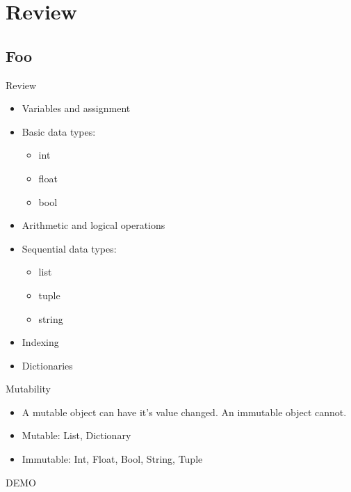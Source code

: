\documentclass[serif,xcolor=pdftex,dvipsnames,table,hyperref={bookmarks=false,breaklinks}]{beamer}
\begin{document}
\maketitlepage

\section{Review}
\subsection{Foo}


\begin{frame}[t]{Review}
	\begin{itemize}[<+->]
		\item Variables and assignment
		\item Basic data types:
		\begin{itemize}[<+->]
			\item int
			\item float
			\item bool
		\end{itemize}
		\item Arithmetic and logical operations
		\item Sequential data types:
		\begin{itemize}[<+->]
			\item list
			\item tuple
			\item string
		\end{itemize}
		\item Indexing
		\item Dictionaries
	\end{itemize}
\end{frame}

\begin{frame}[t]{Mutability}
	\begin{itemize}[<+->]
		\item A mutable object can have it's value changed. An immutable object cannot.
		\item Mutable: List, Dictionary
		\item Immutable: Int, Float, Bool, String, Tuple
	\end{itemize}

	\pause
	\centering
	\Huge{DEMO}
\end{frame}
\end{document}
